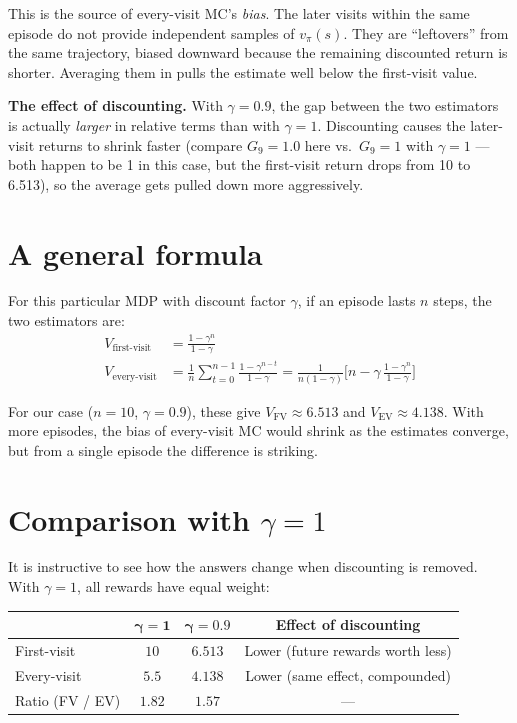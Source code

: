 \documentclass[11pt]{article}
\begin{document}
This is the source of every-visit MC's \textit{bias}. The later visits within the same episode do not provide independent samples of $v_\pi(s)$. They are ``leftovers'' from the same trajectory, biased downward because the remaining discounted return is shorter. Averaging them in pulls the estimate well below the first-visit value.

\textbf{The effect of discounting.} With $\gamma = 0.9$, the gap between the two estimators is actually \textit{larger} in relative terms than with $\gamma = 1$. Discounting causes the later-visit returns to shrink faster (compare $G_9 = 1.0$ here vs.\ $G_9 = 1$ with $\gamma = 1$ --- both happen to be 1 in this case, but the first-visit return drops from 10 to 6.513), so the average gets pulled down more aggressively.

\section*{A general formula}

For this particular MDP with discount factor $\gamma$, if an episode lasts $n$ steps, the two estimators are:
\begin{align}
    V_{\text{first-visit}} &= \frac{1 - \gamma^{n}}{1 - \gamma} \\[6pt]
    V_{\text{every-visit}} &= \frac{1}{n}\sum_{t=0}^{n-1}\frac{1 - \gamma^{n-t}}{1 - \gamma} = \frac{1}{n(1-\gamma)}\Biggl[n - \gamma\,\frac{1 - \gamma^{n}}{1 - \gamma}\Biggr]
\end{align}

For our case ($n = 10$, $\gamma = 0.9$), these give $V_{\text{FV}} \approx 6.513$ and $V_{\text{EV}} \approx 4.138$. With more episodes, the bias of every-visit MC would shrink as the estimates converge, but from a single episode the difference is striking.

\section*{Comparison with $\gamma = 1$}

It is instructive to see how the answers change when discounting is removed. With $\gamma = 1$, all rewards have equal weight:

\begin{table}[H]
    \centering
    \begin{tabular}{lccc}
        \toprule
        & $\boldsymbol{\gamma = 1}$ & $\boldsymbol{\gamma = 0.9}$ & \textbf{Effect of discounting} \\
        \midrule
        First-visit & $10$ & $6.513$ & Lower (future rewards worth less) \\
        Every-visit & $5.5$ & $4.138$ & Lower (same effect, compounded) \\
        Ratio (FV / EV) & $1.82$ & $1.57$ & --- \\
        \bottomrule
    \end{tabular}
\end{table}
\end{document}
